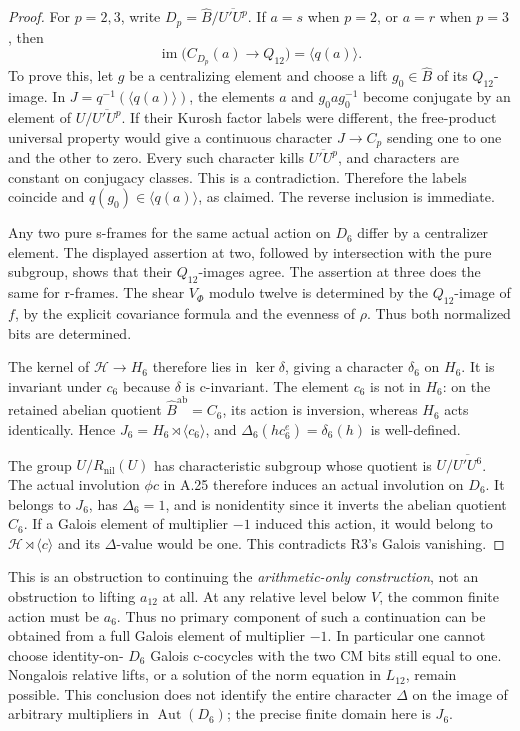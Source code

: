 \begin{proof}
For \(p=2,3\), write
\(D_p=\widehat B/\overline{U'U^p}\).
If \(a=s\) when \(p=2\), or \(a=r\) when
\(p=3\), then
\[
  \operatorname{im}\bigl(C_{D_p}(a)\to Q_{12}\bigr)
                      =\langle q(a)\rangle.
\]
To prove this, let \(g\) be a centralizing element
and choose a lift \(g_0\in\widehat B\) of its
\(Q_{12}\)-image. In
\(J=q^{-1}(\langle q(a)\rangle)\), the elements
\(a\) and \(g_0ag_0^{-1}\) become conjugate
by an element of \(U/\overline{U'U^p}\).
If their Kurosh factor labels were different,
the free-product universal property would give
a continuous character \(J\to C_p\) sending
one to one and the other to zero. Every such
character kills \(\overline{U'U^p}\), and
characters are constant on conjugacy classes.
This is a contradiction. Therefore the labels
coincide and \(q(g_0)\in\langle q(a)\rangle\),
as claimed. The reverse inclusion is immediate.

Any two pure s-frames for the same actual action
on \(D_6\) differ by a centralizer element.
The displayed assertion at two, followed by
intersection with the pure subgroup, shows that
their \(Q_{12}\)-images agree. The assertion at
three does the same for r-frames. The shear
\(V_\Phi\) modulo twelve is determined by the
\(Q_{12}\)-image of \(f\), by the explicit
covariance formula and the evenness of \(\rho\).
Thus both normalized bits are determined.

The kernel of \(\mathcal H\to H_6\) therefore
lies in \(\ker\delta\), giving a character
\(\delta_6\) on \(H_6\). It is invariant under
\(c_6\) because \(\delta\) is c-invariant.
The element \(c_6\) is not in \(H_6\):
on the retained abelian quotient
\(\widehat B^{\mathrm{ab}}=C_6\), its action
is inversion, whereas \(H_6\) acts identically.
Hence \(J_6=H_6\rtimes\langle c_6\rangle\),
and
\(\Delta_6(hc_6^e)=\delta_6(h)\) is well-defined.

The group \(U/R_{\mathrm{nil}}(U)\) has
characteristic subgroup whose quotient is
\(U/\overline{U'U^6}\). The actual involution
\(\phi c\) in A.25 therefore induces an actual
involution on \(D_6\). It belongs to \(J_6\),
has \(\Delta_6=1\), and is nonidentity since
it inverts the abelian quotient \(C_6\).
If a Galois element of multiplier \(-1\)
induced this action, it would belong to
\(\mathcal H\rtimes\langle c\rangle\) and
its \(\Delta\)-value would be one. This
contradicts R3's Galois vanishing.
\end{proof}

This is an obstruction to continuing the
\emph{arithmetic-only construction}, not an
obstruction to lifting \(a_{12}\) at all.
At any relative level below \(V\), the common
finite action must be \(a_6\). Thus no primary
component of such a continuation can be obtained
from a full Galois element of multiplier \(-1\).
In particular one cannot choose identity-on-
\(D_6\) Galois c-cocycles with the two CM bits
still equal to one. Nongalois relative lifts,
or a solution of the norm equation in
\(L_{12}\), remain possible. This conclusion
does not identify the entire character
\(\Delta\) on the image of arbitrary multipliers
in \(\operatorname{Aut}(D_6)\); the precise
finite domain here is \(J_6\).

